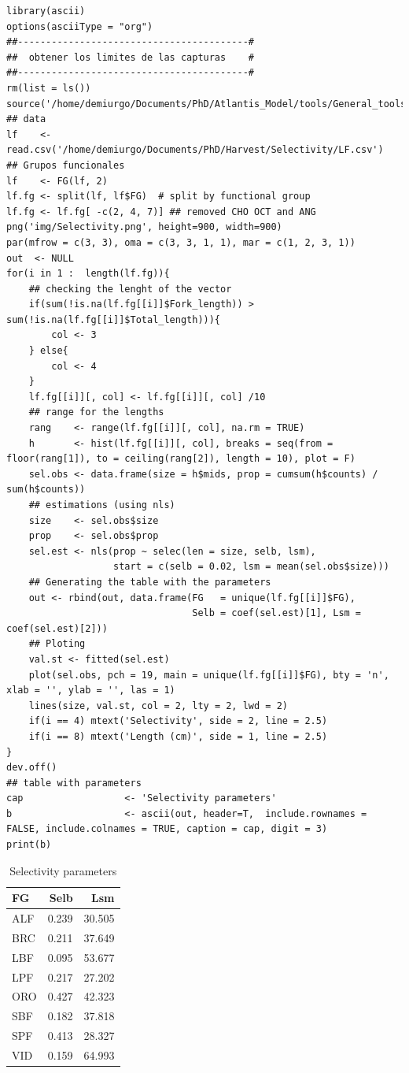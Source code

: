 \documentclass[11pt]{article}
\begin{document}
\begin{verbatim}
library(ascii)
options(asciiType = "org")
##-----------------------------------------#
##  obtener los limites de las capturas    #
##-----------------------------------------#
rm(list = ls())
source('/home/demiurgo/Documents/PhD/Atlantis_Model/tools/General_tools/Atlantis_tools.R')
## data
lf    <- read.csv('/home/demiurgo/Documents/PhD/Harvest/Selectivity/LF.csv')
## Grupos funcionales
lf    <- FG(lf, 2)
lf.fg <- split(lf, lf$FG)  # split by functional group
lf.fg <- lf.fg[ -c(2, 4, 7)] ## removed CHO OCT and ANG
png('img/Selectivity.png', height=900, width=900)
par(mfrow = c(3, 3), oma = c(3, 3, 1, 1), mar = c(1, 2, 3, 1))
out  <- NULL
for(i in 1 :  length(lf.fg)){
    ## checking the lenght of the vector
    if(sum(!is.na(lf.fg[[i]]$Fork_length)) > sum(!is.na(lf.fg[[i]]$Total_length))){
        col <- 3
    } else{
        col <- 4
    }
    lf.fg[[i]][, col] <- lf.fg[[i]][, col] /10
    ## range for the lengths
    rang    <- range(lf.fg[[i]][, col], na.rm = TRUE)
    h       <- hist(lf.fg[[i]][, col], breaks = seq(from = floor(rang[1]), to = ceiling(rang[2]), length = 10), plot = F)
    sel.obs <- data.frame(size = h$mids, prop = cumsum(h$counts) / sum(h$counts))
    ## estimations (using nls)
    size    <- sel.obs$size
    prop    <- sel.obs$prop
    sel.est <- nls(prop ~ selec(len = size, selb, lsm),
                   start = c(selb = 0.02, lsm = mean(sel.obs$size)))
    ## Generating the table with the parameters
    out <- rbind(out, data.frame(FG   = unique(lf.fg[[i]]$FG),
                                 Selb = coef(sel.est)[1], Lsm =  coef(sel.est)[2]))
    ## Ploting
    val.st <- fitted(sel.est)
    plot(sel.obs, pch = 19, main = unique(lf.fg[[i]]$FG), bty = 'n', xlab = '', ylab = '', las = 1)
    lines(size, val.st, col = 2, lty = 2, lwd = 2)
    if(i == 4) mtext('Selectivity', side = 2, line = 2.5)
    if(i == 8) mtext('Length (cm)', side = 1, line = 2.5)
}
dev.off()
## table with parameters
cap                  <- 'Selectivity parameters'
b                    <- ascii(out, header=T,  include.rownames = FALSE, include.colnames = TRUE, caption = cap, digit = 3)
print(b)
\end{verbatim}
\begin{table}[htb]
\caption{Selectivity parameters}
\begin{center}
\begin{tabular}{lrr}
 FG   &   Selb  &     Lsm  \\
\hline
 ALF  &  0.239  &  30.505  \\
 BRC  &  0.211  &  37.649  \\
 LBF  &  0.095  &  53.677  \\
 LPF  &  0.217  &  27.202  \\
 ORO  &  0.427  &  42.323  \\
 SBF  &  0.182  &  37.818  \\
 SPF  &  0.413  &  28.327  \\
 VID  &  0.159  &  64.993  \\
\end{tabular}
\end{center}
\end{table}
\end{document}
